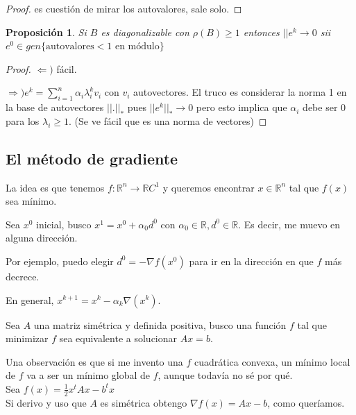 \documentclass[10pt,a4paper,final]{report}
\newtheorem{proposition}{Proposición}
\begin{document}
{\begin{proof}es cuestión de mirar los autovalores, sale solo.
\end{proof}


\begin{proposition}Si $B$ es diagonalizable con $\rho(B) \geq 1$ entonces $||e^k \to 0$ sii $e^0 \in gen\{\text{autovalores} < \text{1 en módulo} \}$
\end{proposition}
\begin{proof}

$\Leftarrow)$ fácil.

$\Rightarrow) e^k = \displaystyle \sum_{i=1}^n \alpha_i \lambda_i^k v_i$ con $v_i$ autovectores. El truco es considerar la norma 1 en la base de autovectores $||.||_*$ pues $||e^k||_* \to 0$ pero esto implica que $\alpha_i$ debe ser 0 para los $\lambda_i \geq 1$. (Se ve fácil que es una norma de vectores)

\end{proof}

\bigskip





\subsection{El método de gradiente}

La idea es que tenemos $f : \mathbb{R}^n \rightarrow \mathbb{R} C^1$ y queremos encontrar $x\in\mathbb{R}^n$ tal que $f(x)$ sea mínimo.

Sea $x^0$ inicial, busco $x^1 = x^0 + \alpha_0 d^0$ con $\alpha_0 \in\mathbb{R}, d^0 \in \mathbb{R}$. Es decir, me muevo en alguna dirección.

Por ejemplo, puedo elegir $d^0 = - \nabla f(x^0)$ para ir en la dirección en que $f$ más decrece.

En general, $x^{k+1} = x^k - \alpha_k \nabla(x^k)$.

Sea $A$ una matriz simétrica y definida positiva, busco una función $f$ tal que minimizar $f$ sea equivalente a solucionar $Ax=b$.

Una observación es que si me invento una $f$ cuadrática convexa, un mínimo local de $f$ va a ser un mínimo global de $f$, aunque todavía no sé por qué.\\

Sea $f(x) = \frac{1}{2} x^t A x - b^t x$\\

Si derivo y uso que $A$ es simétrica obtengo $\nabla f(x) = Ax -b$, como queríamos.\\

}
\end{document}

